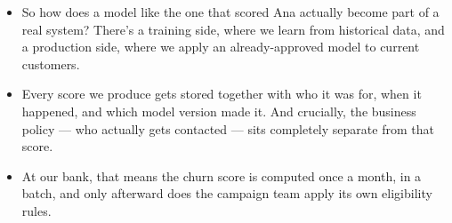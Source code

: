 \documentclass[11pt,a4paper]{article}
\begin{document}
\begin{examplebox}[title after break={SPOKEN SCRIPT --- slide 6 continued}]
\begin{itemize}
\item So how does a model like the one that scored Ana actually become part of a real system? There's a training side, where we learn from historical data, and a production side, where we apply an already-approved model to current customers.
\item Every score we produce gets stored together with who it was for, when it happened, and which model version made it. And crucially, the business policy — who actually gets contacted — sits completely separate from that score.
\item At our bank, that means the churn score is computed once a month, in a batch, and only afterward does the campaign team apply its own eligibility rules.
\end{itemize}
\end{examplebox}
\par\noindent{\scriptsize\textcolor{teal!60!black}{Reading anchor: Bass, Ch. 14 · Kalinowski, §13.2–13.3}}
\clearpage
\end{document}
